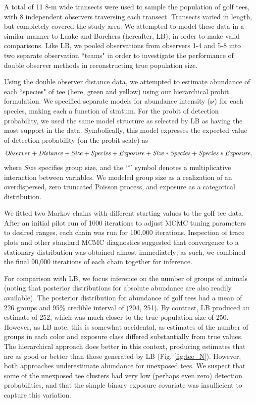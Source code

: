 \documentclass[10pt]{article}
\begin{document}
A total of 11 8-m wide transects were used to sample the population of golf tees, with 8 independent observers traversing each transect.  Transects varied in length, but completely covered the study area.  We attempted to model these data in a similar manner to Laake and Borchers \cite{LaakeBorchers2004} (hereafter, LB), in order to make valid comparisons.  Like LB, we pooled observations from observers 1-4 and 5-8 into two separate observation ``teams" in order to investigate the performance of double observer methods in reconstructing true population size.

Using the double observer distance data, we attempted to estimate abundance of each ``species" of tee (here, green and yellow) using our hierarchical probit formulation.  We specified separate models for abundance intensity ($\boldsymbol{\nu}$) for each species, making each a function of stratum. For the probit of detection probability, we used the same model structure as selected by LB as having the most support in the data.  Symbolically, this model expresses the expected value of detection probability (on the probit scale) as
$$
{\it Observer+Distance+Size+Species+Exposure+Size*Species+Species*Exposure},
$$
where {\it Size} specifies group size, and the `*' symbol denotes a multiplicative interaction between variables.  We modeled group size as a realization of an overdispersed, zero truncated Poisson process, and exposure as a categorical distribution.

We fitted two Markov chains with different starting values to the golf tee data.  After an initial pilot run of 1000 iterations to adjust MCMC tuning parameters to desired ranges, each chain was run for 100,000 iterations.  Inspection of trace plots and other standard MCMC diagnostics suggested that convergence to a stationary distribution was obtained almost immediately; as such, we combined the final 90,000 iterations of each chain together for inference.

For comparison with LB, we focus inference on the number of groups of animals (noting that posterior distributions for absolute abundance are also readily available).  The posterior distribution for abundance of golf tees had a mean of 226 groups and 95\% credible interval of (204, 251).  By contrast, LB produced an estimate of 252, which was much closer to the true population size of 250.  However, as LB note, this is somewhat accidental, as estimates of the number of groups in each
color and exposure class differed substantially from true values.  The hierarchical approach does better in this context, producing estimates that are as good or better than those generated by LB (Fig. \ref{fig:tee_N}).  However, both approaches underestimate abundance for unexposed tees.  We suspect that some of the unexposed tee clusters had very low (perhaps even zero) detection probabilities, and that the simple binary exposure covariate was insufficient to capture this variation.
\end{document}
